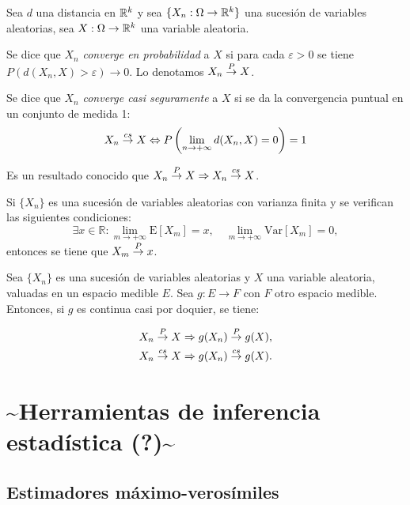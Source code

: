 Sea \(d\) una distancia en \(\mathbb{R}^k\) y sea
\(\{X_n:\Omega\rightarrow\mathbb{R}^k\}\) una sucesión de variables aleatorias,
sea \(X:\Omega \rightarrow \mathbb{R}^k\) una variable aleatoria.

Se dice que \(X_n\) \emph{converge en probabilidad} a \(X\) si para cada
\(\varepsilon>0\) se tiene \(P(d(X_n, X)>\varepsilon)\rightarrow 0\). Lo
denotamos \(X_n\overset{P}{\rightarrow} X\). 

Se dice que \(X_n\) \emph{converge casi seguramente} a \(X\) si se da la
convergencia puntual en un conjunto de medida 1:
\[X_n\overset{cs}{\rightarrow} X\Leftrightarrow P\left(\lim_{n\rightarrow +\infty} d(X_n, X)=0\right)=1\]

Es un resultado conocido que \(X_n\overset{P}{\rightarrow} X\Rightarrow X_n\overset{cs}{\rightarrow} X\).

\lemmab
\label{lm:convergencia-va} Si \(\{X_n\}\) es una sucesión de variables
aleatorias con varianza finita y se verifican las siguientes
condiciones:
\[\exists x\in \mathbb R:\lim_{m\rightarrow +\infty} \mathrm{E}[X_m]=x,\quad \lim_{m\rightarrow +\infty} \mathrm{Var}[X_m]=0,\]
entonces se tiene que \(X_m\overset{P}{\rightarrow} x\). \lemmae

\label{th:cont-map-conv} Sea \(\{X_n\}\) es una sucesión de variables
aleatorias y \(X\) una variable aleatoria, valuadas en un espacio
medible \(E\). Sea \(g:E\rightarrow F\) con \(F\) otro espacio medible.
Entonces, si \(g\) es continua casi por doquier, se tiene:

\begin{gather*}
  X_n\overset{P}{\rightarrow} X \Rightarrow g(X_n)\overset{P}{\rightarrow} g(X),\\
  X_n\overset{cs}{\rightarrow} X \Rightarrow g(X_n)\overset{cs}{\rightarrow} g(X).
\end{gather*}

\theoe

\section{\textasciitilde{}Herramientas de inferencia estadística
(?)\textasciitilde{}}\label{herramientas-de-inferencia-estaduxedstica}

\subsection{Estimadores
máximo-verosímiles}\label{estimadores-muxe1ximo-verosuxedmiles}
